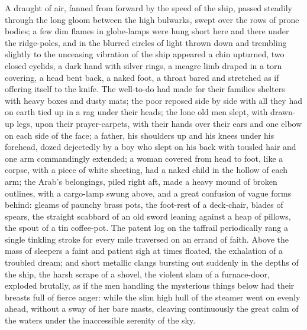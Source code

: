 A draught of air, fanned from forward by the speed of the ship, passed steadily through the long gloom between the high bulwarks, swept over the rows of prone bodies; a few dim flames in globe-lamps were hung short here and there under the ridge-poles, and in the blurred circles of light thrown down and trembling slightly to the unceasing vibration of the ship appeared a chin upturned, two closed eyelids, a dark hand with silver rings, a meagre limb draped in a torn covering, a head bent back, a naked foot, a throat bared and stretched as if offering itself to the knife. The well-to-do had made for their families shelters with heavy boxes and dusty mats; the poor reposed side by side with all they had on earth tied up in a rag under their heads; the lone old men slept, with drawn-up legs, upon their prayer-carpets, with their hands over their ears and one elbow on each side of the face; a father, his shoulders up and his knees under his forehead, dozed dejectedly by a boy who slept on his back with tousled hair and one arm commandingly extended; a woman covered from head to foot, like a corpse, with a piece of white sheeting, had a naked child in the hollow of each arm; the Arab’s belongings, piled right aft, made a heavy mound of broken outlines, with a cargo-lamp swung above, and a great confusion of vague forms behind: gleams of paunchy brass pots, the foot-rest of a deck-chair, blades of spears, the straight scabbard of an old sword leaning against a heap of pillows, the spout of a tin coffee-pot. The patent log on the taffrail periodically rang a single tinkling stroke for every mile traversed on an errand of faith. Above the mass of sleepers a faint and patient sigh at times floated, the exhalation of a troubled dream; and short metallic clangs bursting out suddenly in the depths of the ship, the harsh scrape of a shovel, the violent slam of a furnace-door, exploded brutally, as if the men handling the mysterious things below had their breasts full of fierce anger: while the slim high hull of the steamer went on evenly ahead, without a sway of her bare masts, cleaving continuously the great calm of the waters under the inaccessible serenity of the sky.

